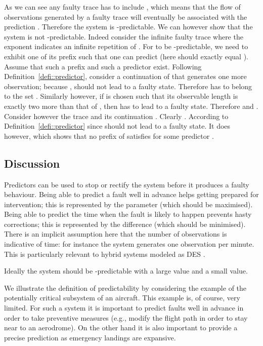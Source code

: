 \documentclass{article}
\begin{document}
As we can see any faulty trace has to include , 
which means that the flow of observations generated by a faulty trace 
will eventually be associated with the prediction .  
Therefore the system is -predictable.  
We can however show that the system is not -predictable.  
Indeed consider the infinite faulty trace  
where the exponent  indicates an infinite repetition of .  
For  to be -predictable, 
we need to exhibit one of its prefix  
such that one can predict  
(here  should exactly equal ).  
Assume that such a prefix and such a predictor exist.  
Following Definition~\ref{defi::predictor}, 
consider a continuation  of  
that generates one more observation; 
because , 
 should not lead to a faulty state.  
Therefore  has to belong to the set 
.  
Similarly however, if  is chosen such that its observable length 
is exactly two more than that of , 
then  has to lead to a faulty state.  
Therefore  and .  
Consider however the trace  
and its continuation .  
Clearly .  
According to Definition~\ref{defi::predictor} 
since  
 should not lead to a faulty state.  
It does however, which shows that no prefix  of  
satisfies  for some predictor .  

\subsection{Discussion}

Predictors can be used to stop or rectify the system 
before it produces a faulty behaviour.  
Being able to predict a fault well in advance 
helps getting prepared for intervention; 
this is represented by the  parameter (which should be maximised).  
Being able to predict the time when the fault is likely to happen 
prevents hasty corrections; 
this is represented by the difference  
(which should be minimised).  
There is an implicit assumption here 
that the number of observations is indicative of time: 
for instance the system generates one observation per minute.  
This is particularly relevant to hybrid systems modeled as DES 
\cite{vento-etal::tsmc::15}.  

Ideally the system should be -predictable with a large  value 
and a small  value.  

We illustrate the definition of predictability by considering the example 
of the potentially critical subsystem of an aircraft.  
This example is, of course, very limited.  
For such a system it is important to predict faults well in advance 
in order to take preventive measures 
(e.g., modify the flight path in order to stay near to an aerodrome).  
On the other hand it is also important to provide a precise prediction 
as emergency landings are expansive.  
\end{document}
